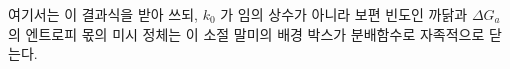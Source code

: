 
여기서는 이 결과식을 받아 쓰되, $k_0$ 가 임의 상수가 아니라 보편 빈도인 까닭과 $\Delta G_a$ 의
엔트로피 몫의 미시 정체는 이 소절 말미의 배경 박스가 분배함수로 자족적으로 닫는다.

